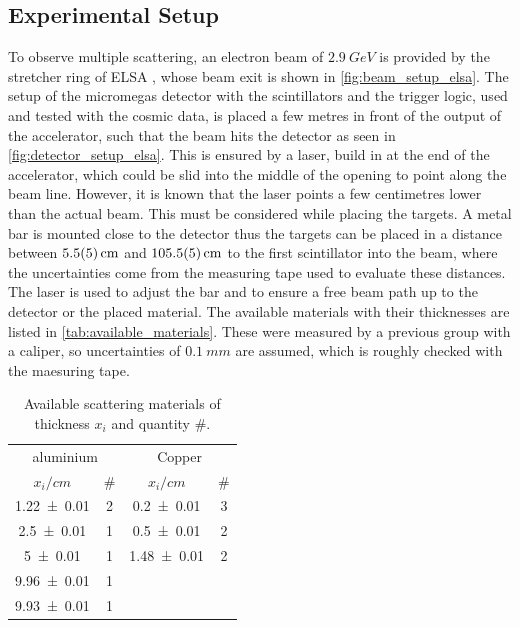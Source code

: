 \documentclass[sn-mathphys-num,iicol]{sn-jnl}
\theoremstyle{thmstyleone}
\theoremstyle{thmstyletwo}
\theoremstyle{thmstylethree}
\begin{document}
\subsection{Experimental Setup}
To observe multiple scattering, an electron beam of $\SI{2.9}{GeV}$ is provided by the stretcher ring of ELSA \cite{ELSA}, whose beam exit is shown in \autoref{fig:beam_setup_elsa}. 
The setup of the micromegas detector with the scintillators and the trigger logic, used and tested with the cosmic data, is placed a few metres in front of the output of the accelerator, such that the beam hits the detector as seen in \autoref{fig:detector_setup_elsa}. 
This is ensured by a laser, build in at the end of the accelerator, which could be slid into the middle of the opening to point along the beam line. 
However, it is known that the laser points a few centimetres lower than the actual beam. 
This must be considered while placing the targets.
A metal bar is mounted close to the detector thus the targets can be placed in a distance between $\SI{5.5\pm 0.5}{cm}$ and $\SI{105.5\pm 0.5}{cm}$ to the first scintillator into the beam, where the uncertainties come from the measuring tape used to evaluate these distances. 
The laser is used to adjust the bar and to ensure a free beam path up to the detector or the placed material.
The available materials with their thicknesses are listed in \autoref{tab:available_materials}. 
These were measured by a previous group with a caliper, so uncertainties of $\SI{0.1}{mm}$ are assumed, which is roughly checked with the maesuring tape.


\begin{table}\centering
  \renewcommand*{\arraystretch}{1.1}
  \begin{tabular}{c|c||c|c}
    \multicolumn{2}{c||}{aluminium} & \multicolumn{2}{c}{Copper} \\
    {\fontsize{8}{3}\selectfont $x_i/\si{cm}$} & {\fontsize{8}{3}\selectfont \#} & {\fontsize{8}{3}\selectfont $x_i/\si{cm}$} & {\fontsize{8}{3}\selectfont \# } \\\hline \rule{0pt}{3ex}
    \num{1.22\pm 0.01} & 2 & \num{0.2\pm 0.01} & 3 \\
    \num{2.5\pm 0.01} & 1 & \num{0.5\pm 0.01} & 2 \\
    \num{5\pm 0.01} & 1 & \num{1.48\pm 0.01} & 2 \\
    \num{9.96\pm 0.01} & 1 & & \\
    \num{9.93\pm 0.01} & 1 & & \\
  \end{tabular}\vspace{3mm}
  \caption{Available scattering materials of thickness $x_i$ and quantity $\#$.}
  \label{tab:available_materials}
\end{table}
\end{document}
